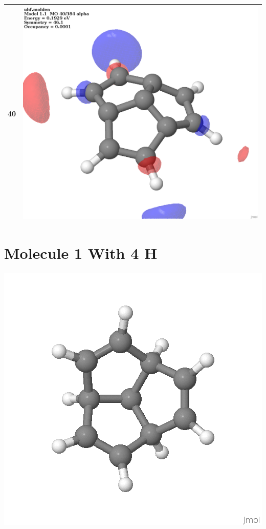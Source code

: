 \documentclass{article}
\begin{document}
\begin{tabular}{|c|c|}
40 & \includegraphics[scale=0.1]{M1T_40.png}\\ \hline
\end{tabular}
\iffalse

\pagebreak
\section{Molecule 1 With 4 H}

\includegraphics[scale=0.5]{M1_h_0001}\\
\end{document}
